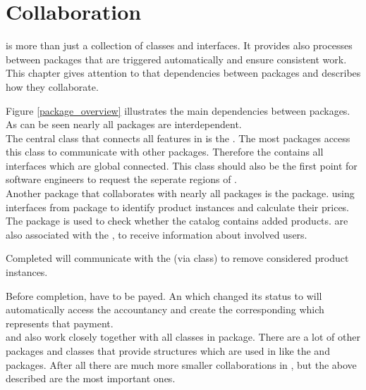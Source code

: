 \chapter{Collaboration}
\label{chap:collaboration}

\salespoint{} is more than just a collection of classes and interfaces. It provides also processes between packages that are triggered automatically and ensure consistent work. This chapter gives attention to that dependencies between packages and describes how they collaborate.  

Figure \ref{package_overview} illustrates the main dependencies between \salespoint{} packages. As can be seen nearly all packages are interdependent.\\ 

The central class that connects all features in \salespoint{} is the . The most packages access this class to communicate with other packages. Therefore the  contains all interfaces which are global connected. This class should also be the first point for software engineers to request the seperate regions of \salespoint{}.\\

Another package that collaborates with nearly all packages is the  package.  using interfaces from  package to identify product instances and calculate their prices. The  package is used to check whether the catalog contains added products.  are also associated with the , to receive information about involved users.\par 
Completed  will communicate with the  (via  class) to remove considered product instances. \par
Before completion,  have to be payed. An  which changed its status to  will automatically access the accountancy and create the corresponding  which represents that payment.\\ 

 and  also work closely together with all classes in  package. There are a lot of other packages and classes that provide structures which are used in \salespoint{} like the  and  packages. After all there are much more smaller collaborations in \salespoint{}, but the above described are the most important ones.




